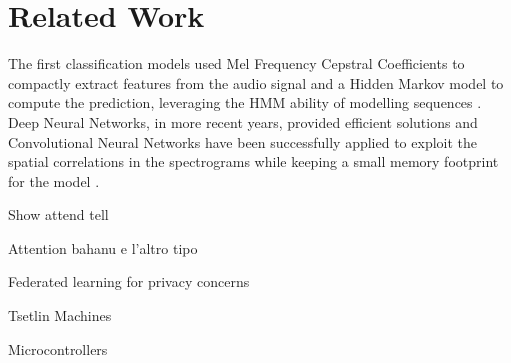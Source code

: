 
\section{Related Work}
\label{sec:related_work}

The first classification models used Mel Frequency Cepstral Coefficients to
compactly extract features from the audio signal and a Hidden Markov model to
compute the prediction, leveraging the HMM ability of modelling sequences
\cite{mfcchmm103088}.
Deep Neural Networks, in more recent years, provided efficient solutions
\cite{chensmallDNN} and Convolutional Neural Networks have been successfully
applied to exploit the spatial correlations in the spectrograms while keeping a
small memory footprint for the model \cite{sainathconvolutional}.

Show attend tell

Attention bahanu e l'altro tipo

Federated learning for privacy concerns

Tsetlin Machines

Microcontrollers
